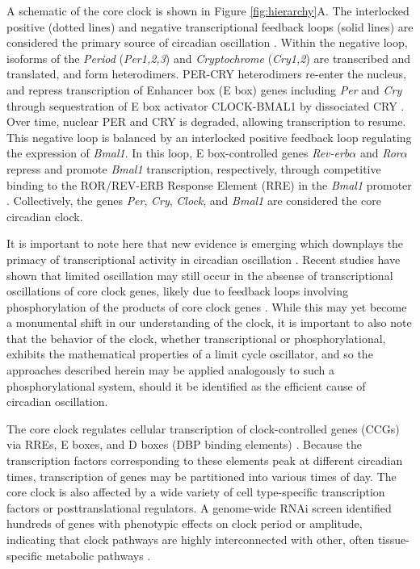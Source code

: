 A schematic of the core clock is shown in Figure \ref{fig:hierarchy}A.
The interlocked positive (dotted lines) and negative transcriptional feedback loops (solid lines) are considered the primary source of circadian oscillation \cite{Mohawk2012, Ko2006}.
Within the negative loop, isoforms of the \textit{Period} (\textit{Per1,2,3}) and \textit{Cryptochrome} (\textit{Cry1,2}) are transcribed and translated, and form heterodimers.
PER-CRY heterodimers re-enter the nucleus, and repress transcription of Enhancer box (E box) genes including \textit{Per} and \textit{Cry} through sequestration of E box activator CLOCK-BMAL1 by dissociated CRY \cite{Ye2011}.
Over time, nuclear PER and CRY is degraded, allowing transcription to resume.
This negative loop is balanced by an interlocked positive feedback loop regulating the expression of \textit{Bmal1}.
In this loop, E box-controlled genes \textit{Rev-erb}$\alpha$ and \textit{Ror}$\alpha$ repress and promote \textit{Bmal1} transcription, respectively, through competitive binding to the ROR/REV-ERB Response Element (RRE) in the \textit{Bmal1} promoter \cite{Emery2004}.
Collectively, the genes \textit{Per}, \textit{Cry}, \textit{Clock}, and \textit{Bmal1} are considered the core circadian clock.

It is important to note here that new evidence is emerging which downplays the primacy of transcriptional activity in circadian oscillation \cite{Dunlap2017}.
Recent studies have shown that limited oscillation may still occur in the absense of transcriptional oscillations of core clock genes, likely due to feedback loops involving phosphorylation of the products of core clock genes \cite{Fan2007, Ode2017, Ode2017a}.
While this may yet become a monumental shift in our understanding of the clock, it is important to also note that the behavior of the clock, whether transcriptional or phosphorylational, exhibits the mathematical properties of a limit cycle oscillator, and so the approaches described herein may be applied analogously to such a phosphorylational system, should it be identified as the efficient cause of circadian oscillation.

The core clock regulates cellular transcription of clock-controlled genes (CCGs) via RREs, E boxes, and D boxes (DBP binding elements) \cite{Ueda2005}. 
Because the transcription factors corresponding to these elements peak at different circadian times, transcription of genes may be partitioned into various times of day.
The core clock is also affected by a wide variety of cell type-specific transcription factors or posttranslational regulators. 
A genome-wide RNAi screen identified hundreds of genes with phenotypic effects on clock period or amplitude, indicating that clock pathways are highly interconnected with other, often tissue-specific metabolic pathways \cite{Zhang2009}.


